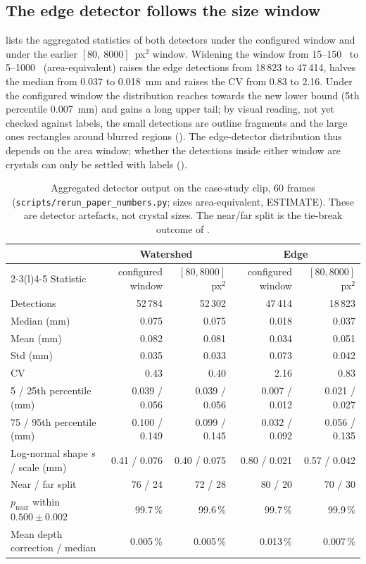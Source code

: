 \subsection{The edge detector follows the size window}\label{sec:csd-edge}

 lists the aggregated statistics of both detectors under the configured window and under
the earlier $[80,\ 8000]$~px$^2$ window. Widening the window from 15--150~\um{} to 5--1000~\um{} (area-equivalent)
raises the edge detections from 18\,823 to 47\,414, halves the median from 0.037 to 0.018~mm and raises the CV
from 0.83 to 2.16. Under the configured window the distribution reaches towards the new lower bound (5th
percentile 0.007~mm) and gains a long upper tail; by visual reading, not yet checked against labels, the small
detections are outline fragments and the large ones rectangles around blurred regions (). The
edge-detector distribution thus depends on the area window; whether the detections inside either window are crystals
can only be settled with labels ().

\begin{table}
\centering\tabfont
\caption{Aggregated detector output on the case-study clip, 60 frames (\texttt{scripts/\allowbreak rerun\_paper\_numbers.py}; sizes
area-equivalent, ESTIMATE). These are detector artefacts, not crystal sizes. The near/far split is the tie-break
outcome of .}\label{tab:ws-compare}
\begin{tabular}{@{}lrrrr@{}}
\toprule
 & \multicolumn{2}{c}{Watershed} & \multicolumn{2}{c}{Edge} \\
\cmidrule(lr){2-3}\cmidrule(l){4-5}
Statistic & configured window & $[80, 8000]$~px$^2$ & configured window & $[80, 8000]$~px$^2$ \\
\midrule
Detections & 52\,784 & 52\,302 & 47\,414 & 18\,823 \\
Median (mm) & 0.075 & 0.075 & 0.018 & 0.037 \\
Mean (mm) & 0.082 & 0.081 & 0.034 & 0.051 \\
Std (mm) & 0.035 & 0.033 & 0.073 & 0.042 \\
CV & 0.43 & 0.40 & 2.16 & 0.83 \\
5 / 25th percentile (mm) & 0.039 / 0.056 & 0.039 / 0.056 & 0.007 / 0.012 & 0.021 / 0.027 \\
75 / 95th percentile (mm) & 0.100 / 0.149 & 0.099 / 0.145 & 0.032 / 0.092 & 0.056 / 0.135 \\
Log-normal shape $s$ / scale (mm) & 0.41 / 0.076 & 0.40 / 0.075 & 0.80 / 0.021 & 0.57 / 0.042 \\
Near / far split & 76 / 24 & 72 / 28 & 80 / 20 & 70 / 30 \\
$p_\mathrm{near}$ within $0.500 \pm 0.002$ & 99.7\,\% & 99.6\,\% & 99.7\,\% & 99.9\,\% \\
Mean depth correction / median & 0.005\,\% & 0.005\,\% & 0.013\,\% & 0.007\,\% \\
\bottomrule
\end{tabular}
\end{table}

